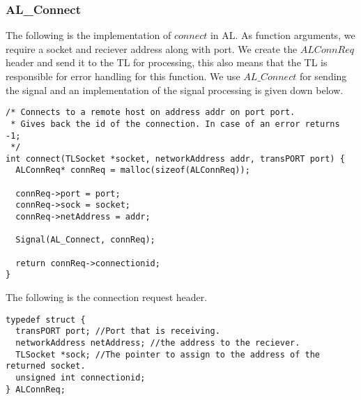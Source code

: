 \subsubsection{AL\_Connect}
The following is the implementation of $connect$ in AL.
As function arguments, we require a socket and reciever address along with port.
We create the $ALConnReq$ header and send it to the TL for processing,
this also means that the TL is responsible for error handling for this function.
We use $AL\_Connect$ for sending the signal and an implementation of the signal processing is given down below.
\begin{lstlisting}
/* Connects to a remote host on address addr on port port.
 * Gives back the id of the connection. In case of an error returns -1;
 */
int connect(TLSocket *socket, networkAddress addr, transPORT port) {
  ALConnReq* connReq = malloc(sizeof(ALConnReq));

  connReq->port = port;
  connReq->sock = socket;
  connReq->netAddress = addr;

  Signal(AL_Connect, connReq);

  return connReq->connectionid;
}
\end{lstlisting}

The following is the connection request header.
\begin{lstlisting}
typedef struct {
  transPORT port; //Port that is receiving.
  networkAddress netAddress; //the address to the reciever.
  TLSocket *sock; //The pointer to assign to the address of the returned socket.
  unsigned int connectionid;
} ALConnReq;
\end{lstlisting}

